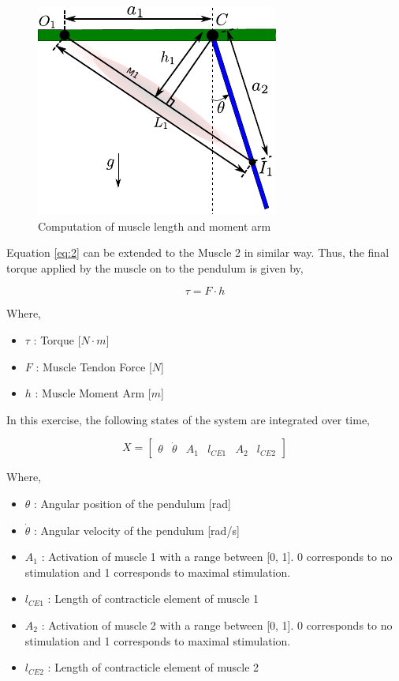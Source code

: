 \documentclass{cmc}
\begin{document}
\begin{figure}[H]
  \centering
  \includegraphics[scale=1]{figures/pendulum_muscles_force_length.pdf}
  \caption[force_length]{Computation of muscle length and moment arm}
  \label{fig:pendulum_muscles_force_length}
\end{figure}

Equation \ref{eq:2} can be extended to the Muscle 2 in similar
way. Thus, the final torque applied by the muscle on to the pendulum
is given by,

\begin{equation}
  \label{eq:3}
  \tau = F \cdot h
\end{equation}

Where,

\begin{itemize}
\item $\tau$ : Torque [$N \cdot m$]
\item $F$ : Muscle Tendon Force [$N$]
\item $h$ : Muscle Moment Arm [$m$]

\end{itemize}

In this exercise, the following states of the system are integrated
over time,

\begin{equation}
  \label{eq:1}
  X = \begin{bmatrix}
    \theta & \dot{\theta} & A_1 & l_{CE1} & A_2 & l_{CE2}
  \end{bmatrix}
\end{equation}

Where,

\begin{itemize}
\item $\theta$ : Angular position of the pendulum [rad]
\item $\dot{\theta}$ : Angular velocity of the pendulum [rad/s]
\item $A_1$ : Activation of muscle 1 with a range between [0, 1].  0
  corresponds to no stimulation and 1 corresponds to maximal
  stimulation.
\item $l_{CE1}$ : Length of contracticle element of muscle 1
\item $A_2$ : Activation of muscle 2 with a range between [0, 1].  0
  corresponds to no stimulation and 1 corresponds to maximal
  stimulation.
\item $l_{CE2}$ : Length of contracticle element of muscle 2
\end{itemize}
\end{document}
